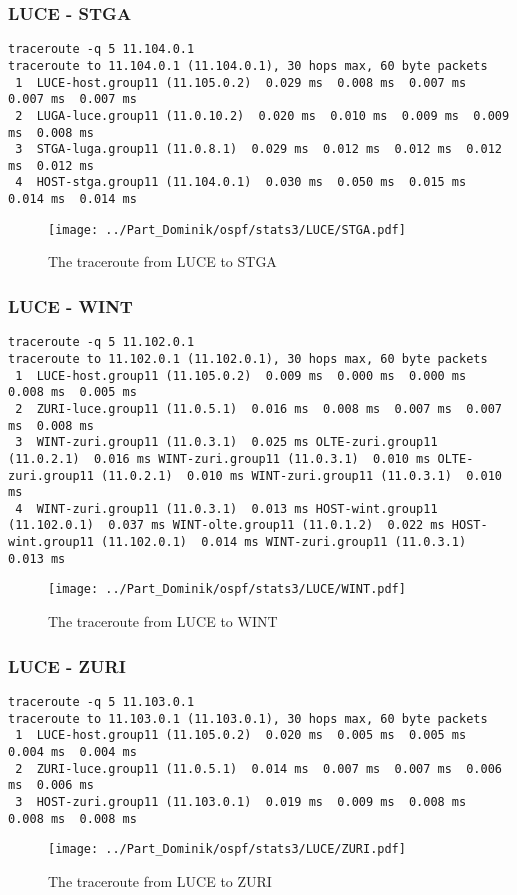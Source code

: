\subsubsection{LUCE - STGA}
\begin{lstlisting}
traceroute -q 5 11.104.0.1
traceroute to 11.104.0.1 (11.104.0.1), 30 hops max, 60 byte packets
 1  LUCE-host.group11 (11.105.0.2)  0.029 ms  0.008 ms  0.007 ms  0.007 ms  0.007 ms
 2  LUGA-luce.group11 (11.0.10.2)  0.020 ms  0.010 ms  0.009 ms  0.009 ms  0.008 ms
 3  STGA-luga.group11 (11.0.8.1)  0.029 ms  0.012 ms  0.012 ms  0.012 ms  0.012 ms
 4  HOST-stga.group11 (11.104.0.1)  0.030 ms  0.050 ms  0.015 ms  0.014 ms  0.014 ms
\end{lstlisting}
\begin{figure}[H]
\centering
\texttt{[image: ../Part\_Dominik/ospf/stats3/LUCE/STGA.pdf]}
\caption{The traceroute from LUCE to STGA}
\end{figure}
\clearpage
\subsubsection{LUCE - WINT}
\begin{lstlisting}
traceroute -q 5 11.102.0.1
traceroute to 11.102.0.1 (11.102.0.1), 30 hops max, 60 byte packets
 1  LUCE-host.group11 (11.105.0.2)  0.009 ms  0.000 ms  0.000 ms  0.008 ms  0.005 ms
 2  ZURI-luce.group11 (11.0.5.1)  0.016 ms  0.008 ms  0.007 ms  0.007 ms  0.008 ms
 3  WINT-zuri.group11 (11.0.3.1)  0.025 ms OLTE-zuri.group11 (11.0.2.1)  0.016 ms WINT-zuri.group11 (11.0.3.1)  0.010 ms OLTE-zuri.group11 (11.0.2.1)  0.010 ms WINT-zuri.group11 (11.0.3.1)  0.010 ms
 4  WINT-zuri.group11 (11.0.3.1)  0.013 ms HOST-wint.group11 (11.102.0.1)  0.037 ms WINT-olte.group11 (11.0.1.2)  0.022 ms HOST-wint.group11 (11.102.0.1)  0.014 ms WINT-zuri.group11 (11.0.3.1)  0.013 ms
\end{lstlisting}
\begin{figure}[H]
\centering
\texttt{[image: ../Part\_Dominik/ospf/stats3/LUCE/WINT.pdf]}
\caption{The traceroute from LUCE to WINT}
\end{figure}
\clearpage
\subsubsection{LUCE - ZURI}
\begin{lstlisting}
traceroute -q 5 11.103.0.1
traceroute to 11.103.0.1 (11.103.0.1), 30 hops max, 60 byte packets
 1  LUCE-host.group11 (11.105.0.2)  0.020 ms  0.005 ms  0.005 ms  0.004 ms  0.004 ms
 2  ZURI-luce.group11 (11.0.5.1)  0.014 ms  0.007 ms  0.007 ms  0.006 ms  0.006 ms
 3  HOST-zuri.group11 (11.103.0.1)  0.019 ms  0.009 ms  0.008 ms  0.008 ms  0.008 ms
\end{lstlisting}
\begin{figure}[H]
\centering
\texttt{[image: ../Part\_Dominik/ospf/stats3/LUCE/ZURI.pdf]}
\caption{The traceroute from LUCE to ZURI}
\end{figure}
\clearpage
